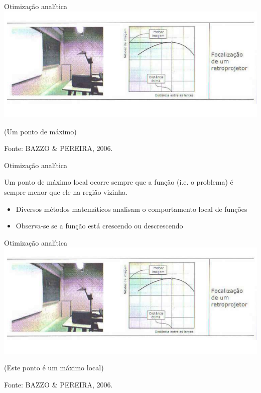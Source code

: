 \documentclass{beamer}
\begin{document}
\begin{frame}{Otimização analítica}
  \centering
  \includegraphics[width=1.1\textwidth]{otimizacao/1var}

(Um ponto de máximo)

\vfill
Fonte: BAZZO \& PEREIRA, 2006.
\end{frame}

\begin{frame}{Otimização analítica}
  \begin{block}{}
    Um ponto de máximo local ocorre sempre que a função (i.e. o problema) é sempre menor que ele na região vizinha.
  \end{block}

  \begin{itemize}
  \item Diversos métodos matemáticos analisam o comportamento local de funções
  \item Observa-se se a função está crescendo ou descrescendo
  \end{itemize}
\end{frame}

\begin{frame}{Otimização analítica}
  \centering
  \includegraphics[width=1.1\textwidth]{otimizacao/1var}

(Este ponto é um máximo local)

\vfill
Fonte: BAZZO \& PEREIRA, 2006.
\end{frame}
\end{document}
